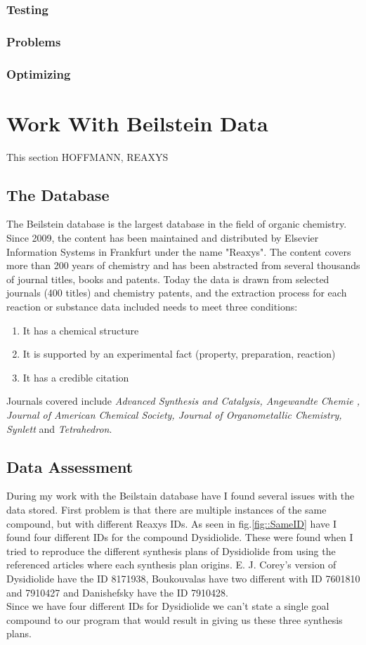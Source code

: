 \documentclass[a4paper,10pt,titlepage]{paper}
\begin{document}
\subsubsection{Testing}
\subsubsection{Problems}
\subsubsection{Optimizing}

\section{Work With Beilstein Data}
This section HOFFMANN, REAXYS
\subsection{The Database}
The Beilstein database is the largest database in the field of organic chemistry. Since 2009, the content has been maintained and distributed by Elsevier Information Systems in Frankfurt under the name "Reaxys".
The content covers more than 200 years of chemistry and has been abstracted from several thousands of journal titles, books and patents. Today the data is drawn from selected journals (400 titles) and chemistry patents, and the extraction process for each reaction or substance data included needs to meet three conditions:
\begin{enumerate}
\item
It has a chemical structure
\item
It is supported by an experimental fact (property, preparation, reaction)
\item
It has a credible citation
\end{enumerate}
Journals covered include \textit{Advanced Synthesis and Catalysis, Angewandte Chemie , Journal of American Chemical Society, Journal of Organometallic Chemistry, Synlett} and \textit{Tetrahedron}. \cite{WikiReaxys}\cite{WikiBeilstein}
\subsection{Data Assessment}
During my work with the Beilstain database have I found several issues with the data stored.
First problem is that there are multiple instances of the same compound, but with different Reaxys IDs. As seen in fig.\ref{fig::SameID} have I found four different IDs for the compound Dysidiolide. These were found when I tried to reproduce the different synthesis plans of Dysidiolide from \cite{SynthesisPlans} using the referenced articles where each synthesis plan origins. E. J. Corey's version of Dysidiolide have the ID 8171938, Boukouvalas have two different with ID 7601810 and 7910427 and Danishefsky have the ID 7910428. \\
Since we have four different IDs for Dysidiolide we can't state a single goal compound to our program that would result in giving us these three synthesis plans.
\end{document}
